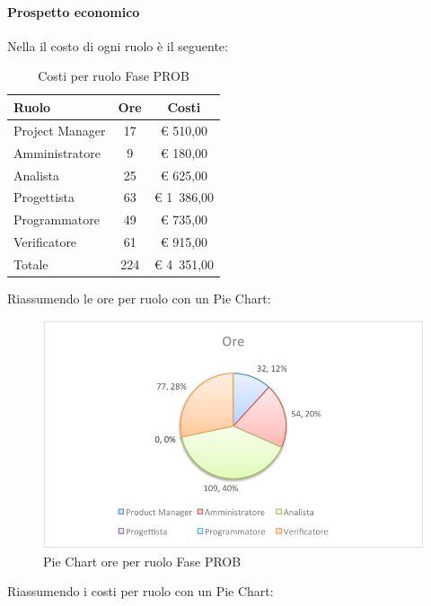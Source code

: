 			\paragraph{Prospetto economico}
				Nella  il costo di ogni ruolo è il seguente:
				\begin{table}[H]
					\begin{center}
						\begin{tabular}{| l | c | c |}
							\hline
							Ruolo 			& Ore 	& Costi  \\ \hline
							
							Project Manager	& 17 		& \euro{} 510,00 	\\
							Amministratore 		& 9 		& \euro{} 180,00 	\\
							Analista	 		& 25 		& \euro{} 625,00 	\\
							Progettista 		& 63 		& \euro{} 1~386,00  	\\
							Programmatore		& 49 		& \euro{} 735,00 	\\
							Verificatore		& 61 		& \euro{} 915,00 	\\ \hline \hline
							
							Totale	 		& 224 	& \euro{} 4~351,00 	\\ \hline
						\end{tabular}
					\end{center}
					\caption{Costi per ruolo Fase PROB}
				\end{table}
				Riassumendo le ore per ruolo con un Pie Chart:
				\begin{figure}[H]\centering
					\includegraphics[width=\textwidth]{PianoDiProgetto/Pics/ChartTotOreFasePROB.pdf}
					\caption{Pie Chart ore per ruolo Fase PROB}
				\end{figure}
				Riassumendo i costi per ruolo con un Pie Chart:

